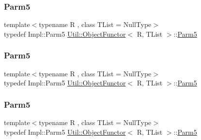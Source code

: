 \mbox{\label{classUtil_1_1ObjectFunctor_a8428e04dd3fb91bc7f7c518a1771eecb}} 
\subsubsection{\texorpdfstring{Parm5}{Parm5}\hspace{0.1cm}{\footnotesize\ttfamily [1/3]}}
{\footnotesize\ttfamily template$<$typename R , class T\+List  = Null\+Type$>$ \\
typedef Impl\+::\+Parm5 \mbox{\hyperlink{classUtil_1_1ObjectFunctor}{Util\+::\+Object\+Functor}}$<$ R, T\+List $>$\+::\mbox{\hyperlink{classUtil_1_1ObjectFunctor_a8428e04dd3fb91bc7f7c518a1771eecb}{Parm5}}}

\mbox{\label{classUtil_1_1ObjectFunctor_a8428e04dd3fb91bc7f7c518a1771eecb}} 
\subsubsection{\texorpdfstring{Parm5}{Parm5}\hspace{0.1cm}{\footnotesize\ttfamily [2/3]}}
{\footnotesize\ttfamily template$<$typename R , class T\+List  = Null\+Type$>$ \\
typedef Impl\+::\+Parm5 \mbox{\hyperlink{classUtil_1_1ObjectFunctor}{Util\+::\+Object\+Functor}}$<$ R, T\+List $>$\+::\mbox{\hyperlink{classUtil_1_1ObjectFunctor_a8428e04dd3fb91bc7f7c518a1771eecb}{Parm5}}}

\mbox{\label{classUtil_1_1ObjectFunctor_a8428e04dd3fb91bc7f7c518a1771eecb}} 
\subsubsection{\texorpdfstring{Parm5}{Parm5}\hspace{0.1cm}{\footnotesize\ttfamily [3/3]}}
{\footnotesize\ttfamily template$<$typename R , class T\+List  = Null\+Type$>$ \\
typedef Impl\+::\+Parm5 \mbox{\hyperlink{classUtil_1_1ObjectFunctor}{Util\+::\+Object\+Functor}}$<$ R, T\+List $>$\+::\mbox{\hyperlink{classUtil_1_1ObjectFunctor_a8428e04dd3fb91bc7f7c518a1771eecb}{Parm5}}}

